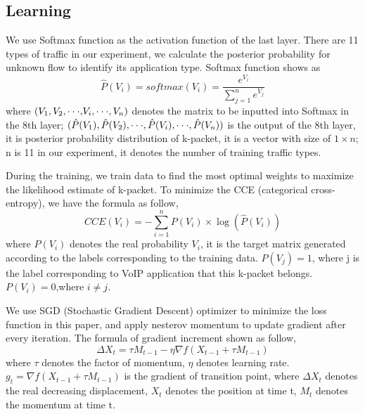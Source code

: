\documentclass[conference]{IEEEtran}
\begin{document}
\subsection{Learning}
We use Softmax function as the activation function of the last layer. There are 11 types of traffic in our experiment, we calculate the posterior probability for unknown flow to identify its application type. Softmax function shows as
\begin{equation}
\hat P({V_i}) = softmax({V_i}) = \frac{{{e^{{V_i}}}}}{{\sum\limits_{j = 1}^n {{e^{{V_j}}}} }}
\end{equation}
where $({V_1},{V_2},{\rm{\cdot\cdot\cdot,}}{V_i},{\rm{\cdot\cdot\cdot}},{V_n})$ denotes the matrix to be inputted into Softmax in the 8th layer; $(\hat P({V_1}),\hat P({V_2}),{\rm{\cdot\cdot\cdot}},\hat P({V_i}),{\rm{\cdot\cdot\cdot}},\hat P({V_n}))$ is the output of the 8th layer, it is posterior probability distribution of k-packet, it is a vector with size of $1 \times n$; n is 11 in our experiment, it denotes the number of training traffic types.

During the training, we train data to find the most optimal weights to maximize the likelihood estimate of k-packet. To minimize the CCE (categorical cross-entropy), we have the formula as follow,
\begin{equation}
CCE({V_i}) =  - \sum\limits_{i = 1}^n {P({V_i}) \times \log (\hat P({V_i}))}
\end{equation}
where $P({V_i})$ denotes the real probability ${V_i}$, it is the target matrix generated according to the labels corresponding to the training data. $P({V_j})=1$, where j is the label corresponding to VoIP application that this k-packet belongs.$P({V_i})=0$,where $i \ne j$.

We use SGD (Stochastic Gradient Descent) optimizer to minimize the loss function in this paper, and apply nesterov momentum to update gradient after every iteration. The formula of gradient increment shown as follow,
\begin{equation}
\Delta {X_t} = \tau {M_{t - 1}} - \eta \nabla f({X_{t - 1}} + \tau {M_{t - 1}})
\end{equation}
where ${\tau}$ denotes the factor of momentum, ${\eta}$ denotes learning rate. ${g_t} = \nabla f({X_{t - 1}} + \tau {M_{t - 1}})$ is the gradient of transition point, where $\Delta {X_t}$ denotes the real decreasing displacement, ${X_t}$ denotes the position at time t, ${M_t}$ denotes the momentum at time t.
\end{document}
